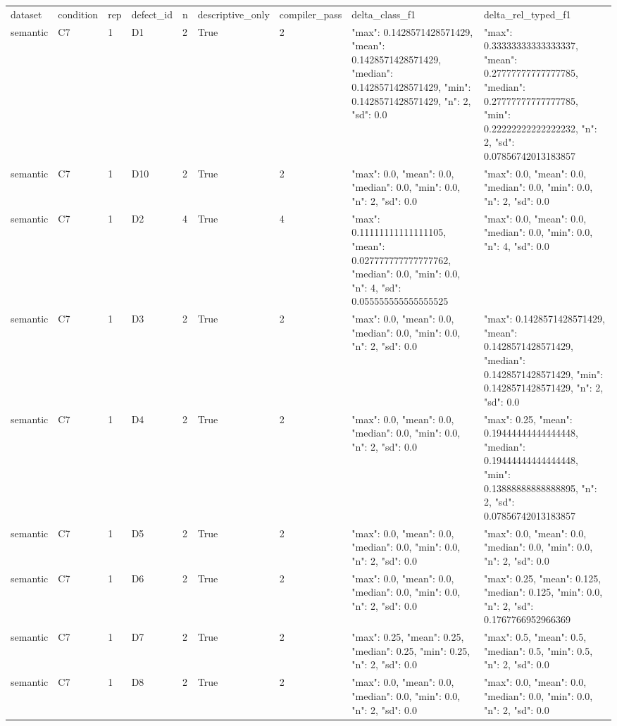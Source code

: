 \begin{tabular}{lllllllll}
dataset & condition & rep & defect\_id & n & descriptive\_only & compiler\_pass & delta\_class\_f1 & delta\_rel\_typed\_f1 \\
semantic & C7 & 1 & D1 & 2 & True & 2 & {"max": 0.1428571428571429, "mean": 0.1428571428571429, "median": 0.1428571428571429, "min": 0.1428571428571429, "n": 2, "sd": 0.0} & {"max": 0.33333333333333337, "mean": 0.27777777777777785, "median": 0.27777777777777785, "min": 0.22222222222222232, "n": 2, "sd": 0.07856742013183857} \\
semantic & C7 & 1 & D10 & 2 & True & 2 & {"max": 0.0, "mean": 0.0, "median": 0.0, "min": 0.0, "n": 2, "sd": 0.0} & {"max": 0.0, "mean": 0.0, "median": 0.0, "min": 0.0, "n": 2, "sd": 0.0} \\
semantic & C7 & 1 & D2 & 4 & True & 4 & {"max": 0.11111111111111105, "mean": 0.027777777777777762, "median": 0.0, "min": 0.0, "n": 4, "sd": 0.055555555555555525} & {"max": 0.0, "mean": 0.0, "median": 0.0, "min": 0.0, "n": 4, "sd": 0.0} \\
semantic & C7 & 1 & D3 & 2 & True & 2 & {"max": 0.0, "mean": 0.0, "median": 0.0, "min": 0.0, "n": 2, "sd": 0.0} & {"max": 0.1428571428571429, "mean": 0.1428571428571429, "median": 0.1428571428571429, "min": 0.1428571428571429, "n": 2, "sd": 0.0} \\
semantic & C7 & 1 & D4 & 2 & True & 2 & {"max": 0.0, "mean": 0.0, "median": 0.0, "min": 0.0, "n": 2, "sd": 0.0} & {"max": 0.25, "mean": 0.19444444444444448, "median": 0.19444444444444448, "min": 0.13888888888888895, "n": 2, "sd": 0.07856742013183857} \\
semantic & C7 & 1 & D5 & 2 & True & 2 & {"max": 0.0, "mean": 0.0, "median": 0.0, "min": 0.0, "n": 2, "sd": 0.0} & {"max": 0.0, "mean": 0.0, "median": 0.0, "min": 0.0, "n": 2, "sd": 0.0} \\
semantic & C7 & 1 & D6 & 2 & True & 2 & {"max": 0.0, "mean": 0.0, "median": 0.0, "min": 0.0, "n": 2, "sd": 0.0} & {"max": 0.25, "mean": 0.125, "median": 0.125, "min": 0.0, "n": 2, "sd": 0.1767766952966369} \\
semantic & C7 & 1 & D7 & 2 & True & 2 & {"max": 0.25, "mean": 0.25, "median": 0.25, "min": 0.25, "n": 2, "sd": 0.0} & {"max": 0.5, "mean": 0.5, "median": 0.5, "min": 0.5, "n": 2, "sd": 0.0} \\
semantic & C7 & 1 & D8 & 2 & True & 2 & {"max": 0.0, "mean": 0.0, "median": 0.0, "min": 0.0, "n": 2, "sd": 0.0} & {"max": 0.0, "mean": 0.0, "median": 0.0, "min": 0.0, "n": 2, "sd": 0.0} \\

\end{tabular}
